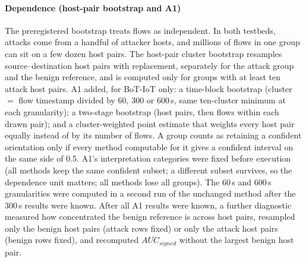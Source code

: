 \documentclass[preprint,12pt]{elsarticle}
\begin{document}
\paragraph{Dependence (host-pair bootstrap and A1)} The preregistered bootstrap treats flows as independent. In both testbeds, attacks come from a handful of attacker hosts, and millions of flows in one group can sit on a few dozen host pairs. The host-pair cluster bootstrap resamples source--destination host pairs with replacement, separately for the attack group and the benign reference, and is computed only for groups with at least ten attack host pairs. A1 added, for BoT-IoT only: a time-block bootstrap (cluster $=$ flow timestamp divided by 60, 300 or 600\,s, same ten-cluster minimum at each granularity); a two-stage bootstrap (host pairs, then flows within each drawn pair); and a cluster-weighted point estimate that weights every host pair equally instead of by its number of flows. A group counts as retaining a confident orientation only if every method computable for it gives a confident interval on the same side of 0.5. A1's interpretation categories were fixed before execution (all methods keep the same confident subset; a different subset survives, so the dependence unit matters; all methods lose all groups). The 60\,s and 600\,s granularities were computed in a second run of the unchanged method after the 300\,s results were known. After all A1 results were known, a further diagnostic measured how concentrated the benign reference is across host pairs, resampled only the benign host pairs (attack rows fixed) or only the attack host pairs (benign rows fixed), and recomputed $AUC_{signed}$ without the largest benign host pair.
\end{document}
